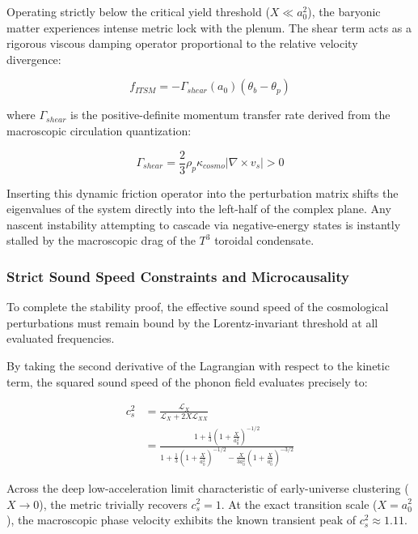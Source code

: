 \documentclass[aps,prd,10pt,twocolumn,superscriptaddress,nofootinbib,floatfix]{revtex4-2}
\begin{document}
Operating strictly below the critical yield threshold ($X \ll a_0^2$), the baryonic matter experiences intense metric lock with the plenum. The shear term acts as a rigorous viscous damping operator proportional to the relative velocity divergence:

\begin{equation}
f_{ITSM} = -\Gamma_{shear}(a_0) \left( \theta_b - \theta_p \right)
\end{equation}

where $\Gamma_{shear}$ is the positive-definite momentum transfer rate derived from the macroscopic circulation quantization:

\begin{equation}
\Gamma_{shear} = \frac{2}{3} \rho_p \kappa_{cosmo} |\nabla \times v_s| > 0
\end{equation}

Inserting this dynamic friction operator into the perturbation matrix shifts the eigenvalues of the system directly into the left-half of the complex plane. Any nascent instability attempting to cascade via negative-energy states is instantly stalled by the macroscopic drag of the $T^3$ toroidal condensate.

\subsubsection{\label{sec:microcausality}Strict Sound Speed Constraints and Microcausality}

To complete the stability proof, the effective sound speed of the cosmological perturbations must remain bound by the Lorentz-invariant threshold at all evaluated frequencies.

By taking the second derivative of the Lagrangian with respect to the kinetic term, the squared sound speed of the phonon field evaluates precisely to:

\begin{align}
c_s^2 &= \frac{\mathcal{L}_X}{\mathcal{L}_X + 2X\mathcal{L}_{XX}} \nonumber \\
      &= \frac{1 + \frac{1}{3}\left(1+\frac{X}{a_0^2}\right)^{-1/2}}{1 + \frac{1}{3}\left(1+\frac{X}{a_0^2}\right)^{-1/2} - \frac{X}{3a_0^2}\left(1+\frac{X}{a_0^2}\right)^{-3/2}}
\end{align}

Across the deep low-acceleration limit characteristic of early-universe clustering ($X \rightarrow 0$), the metric trivially recovers $c_s^2 = 1$. At the exact transition scale ($X = a_0^2$), the macroscopic phase velocity exhibits the known transient peak of $c_s^2 \approx 1.11$.
\end{document}
